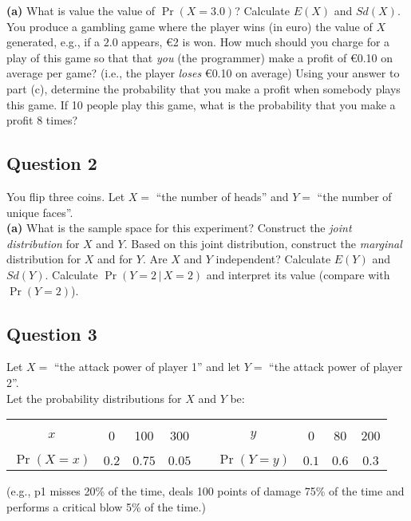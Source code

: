 \documentclass[]{article}
\begin{document}
{\bf(a)} What is value the value of $\Pr(X = 3.0)$?  Calculate $E(X)$ and $Sd(X)$.  You produce a gambling game where the player wins (in euro) the value of $X$ generated, e.g., if a $2.0$ appears, \euro{2} is won. How much should you charge for a play of this game so that that \emph{you} (the programmer) make a profit of \euro{0.10} on average per game? (i.e., the player \emph{loses} \euro{0.10} on average)  Using your answer to part (c), determine the probability that you make a profit when somebody plays this game.  If 10 people play this game, what is the probability that you make a profit 8 times?

\subsection*{Question 2}
You flip three coins. Let $X = $ ``the number of heads'' and $Y = $ ``the number of unique faces''.\\[-0.2cm]

{\bf(a)} What is the sample space for this experiment?  Construct the \emph{joint distribution} for $X$ and $Y$.  Based on this joint distribution, construct the \emph{marginal} distribution for $X$ and for $Y$.  Are $X$ and $Y$ independent?  Calculate $E(Y)$ and $Sd(Y)$.  Calculate $\Pr(Y=2\,|\,X=2)$ and interpret its value (compare with $\Pr(Y=2)$).


\subsection*{Question 3}
Let $X =$ ``the attack power of player 1'' and let $Y =$ ``the attack power of player 2''.\\[-0.3cm]

Let the probability distributions for $X$ and $Y$ be:
\begin{center}
	\begin{tabular}{|c|ccc|c|c|ccc|}
		\cline{1-4}\cline{6-9}
		&&&&&&&&\\[-0.4cm]
		$x$ & 0 & 100 & 300 & \qquad\qquad & $y$ & 0 & 80 & 200\\
		\cline{1-4}\cline{6-9}
		&&&&&&&&\\[-0.4cm]
		$\Pr(X=x)$ & $0.2$ & $0.75$ & $0.05$ & & $\Pr(Y=y)$ & $0.1$ & $0.6$ & $0.3$ \\[0.1cm]
		\cline{1-4}\cline{6-9}
	\end{tabular}
\end{center}
{\footnotesize(e.g., p1 misses 20\% of the time, deals 100 points of damage 75\% of the time and performs a critical blow 5\% of the time.)}\\[-0.2cm]
\end{document}
